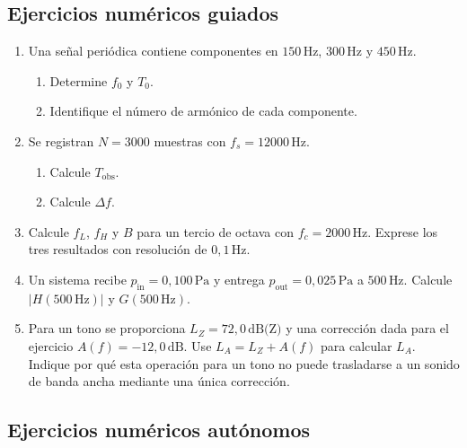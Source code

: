 \subsection*{Ejercicios numéricos guiados}

\begin{enumerate}[label=\textbf{G\arabic*.},leftmargin=*]
    \item Una señal periódica contiene componentes en
    \(150\,\text{Hz}\), \(300\,\text{Hz}\) y \(450\,\text{Hz}\).
    \begin{enumerate}[label=\alph*)]
        \item Determine \(f_0\) y \(T_0\).
        \item Identifique el número de armónico de cada componente.
    \end{enumerate}

    \item Se registran \(N=3000\) muestras con
    \(f_s=12000\,\text{Hz}\).
    \begin{enumerate}[label=\alph*)]
        \item Calcule \(T_\mathrm{obs}\).
        \item Calcule \(\Delta f\).
    \end{enumerate}

    \item Calcule \(f_L\), \(f_H\) y \(B\) para un tercio de octava con
    \(f_c=2000\,\text{Hz}\). Exprese los tres resultados con resolución de
    \(0{,}1\,\text{Hz}\).

    \item Un sistema recibe \(p_\mathrm{in}=0{,}100\,\text{Pa}\) y entrega
    \(p_\mathrm{out}=0{,}025\,\text{Pa}\) a \(500\,\text{Hz}\).
    Calcule \(\lvert H(500\,\text{Hz})\rvert\) y \(G(500\,\text{Hz})\).

    \item Para un tono se proporciona \(L_Z=72{,}0\,\text{dB(Z)}\) y una
    corrección dada para el ejercicio \(A(f)=-12{,}0\,\text{dB}\). Use
    \(L_A=L_Z+A(f)\) para calcular \(L_A\). Indique por qué esta operación para
    un tono no puede trasladarse a un sonido de banda ancha mediante una única
    corrección.
\end{enumerate}

\subsection*{Ejercicios numéricos autónomos}

